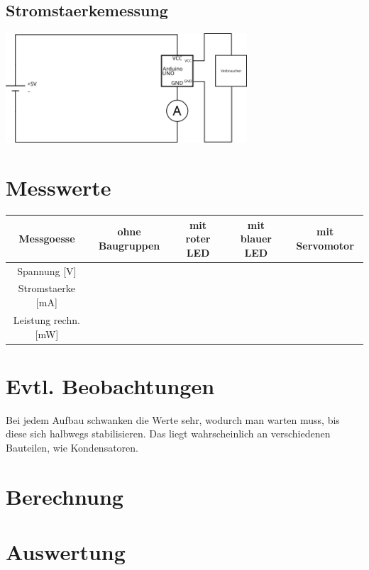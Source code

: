 \documentclass[8pt, letterpaper]{article}
\begin{document}
\subsection{Stromstaerkemessung}
\includegraphics[width=9cm]{ampere}

\section{Messwerte}
\begin{center}
\begin{tabular}{ |c|c|c|c|c| }
  Messgoesse & ohne Baugruppen & mit roter LED & mit blauer LED & mit Servomotor \\
  \hline
  Spannung [V] & & & & \\
  \hline
  Stromstaerke [mA] & & & & \\
  \hline
  Leistung rechn. [mW] & & & & \\
  \hline
\end{tabular}
\end{center}

\section{Evtl. Beobachtungen}
Bei jedem Aufbau schwanken die Werte sehr, wodurch man warten muss, bis diese sich halbwegs stabilisieren. Das liegt wahrscheinlich an verschiedenen Bauteilen, wie Kondensatoren.

\section{Berechnung}

\break

\section{Auswertung}
\end{document}
